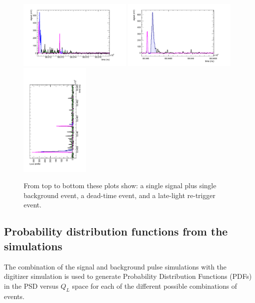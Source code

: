 \documentclass[letter,twocolumn,preprint,3p,numbers,sort&compress]{elsarticle}
\begin{document}
\begin{figure}[!htpb]
\centering
\includegraphics[width=0.49\textwidth]{figures/pileup1.pdf}
\includegraphics[width=0.49\textwidth]{figures/retrig1.pdf}
\includegraphics[width=0.3\textwidth,angle=-90]{figures/latelight1.pdf}
\caption{ From top to bottom these plots show: a single signal plus
  single background event, a dead-time event, and a late-light
  re-trigger event. }\label{fig:eventTypes2}
\end{figure}



\subsection{ Probability distribution functions from the simulations }

The combination of the signal and background pulse simulations with
the digitizer simulation is used to generate Probability Distribution
Functions (PDFs) in the PSD versus $Q_L$ space for each of the
different possible combinations of events.
\end{document}

